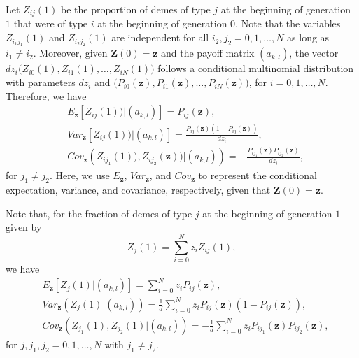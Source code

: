 \documentclass[11pt]{article}
\begin{document}
Let $Z_{ij}(1)$ be the proportion of demes of type $j$ at the beginning of generation $1$ that were of type $i$ at the beginning of generation $0$. Note that  the variables $Z_{i_1j_1}(1)$ and $Z_{i_2j_2}(1)$ are independent for all $i_2,j_2=0,1,\ldots,N$ as long as $i_1\neq i_2$. Moreover, given $\mathbf{Z}(0)=\mathbf{z}$ and the payoff matrix $(a_{k, l})$, the vector $dz_i\Big(Z_{i0}(1),Z_{i1}(1),\ldots,Z_{iN}(1)\Big)$ follows a conditional multinomial distribution with parameters $dz_i$ and $\Big(P_{i0}(\mathbf{z}),P_{i1}(\mathbf{z}),\ldots,P_{iN}(\mathbf{z})\Big)$, for $i=0, 1, \ldots, N$.
Therefore, we have
\begin{subequations}\label{sec2-eq1}
\begin{align}
&E_{\mathbf{z}}\left[ Z_{ij}(1))\Big|(a_{k,l})\right]=P_{ij}(\mathbf{z}),\\
&Var_{\mathbf{z}}\left[ Z_{ij}(1))\Big|(a_{k,l})\right]=\frac{P_{ij}(\mathbf{z})\left(1-P_{ij}(\mathbf{z})\right)}{dz_i},\\
&Cov_{\mathbf{z}}\left(Z_{ij_1}(1)),Z_{ij_2}(\mathbf{z}))\Big|(a_{k,l})\right)=-\frac{P_{ij_1}(\mathbf{z})P_{ij_2}(\mathbf{z})}{dz_i},
\end{align}
\end{subequations}
for $j_1\not= j_2$. Here, we use $E_{\mathbf{z}}$, $Var_{\mathbf{z}}$, and $Cov_{\mathbf{z}}$ to represent the conditional expectation, variance, and covariance, respectively, given that $\mathbf{Z}(0)=\mathbf{z}$.

Note that, for the fraction of demes of type $j$ at the beginning of generation $1$ given by
\begin{equation}\label{sec2-eq2}
Z_j(1)=\sum_{i=0}^{N}z_iZ_{ij}(1),
\end{equation}
we have
\begin{subequations}\label{sec2-eq3}
\begin{align}
&E_{\mathbf{z}}\left[Z_j(1)\Big|(a_{k,l})\right]=\sum_{i=0}^{N}z_iP_{ij}(\mathbf{z}),\\
&Var_{\mathbf{z}}\left(Z_j(1)\Big|(a_{k,l})\right)
=\frac{1}{d}\sum_{i=0}^{N}z_iP_{ij}(\mathbf{z})\left(1-P_{ij}(\mathbf{z})\right),\\
&Cov_{\mathbf{z}}\left(Z_{j_1}(1),Z_{j_2}(1)\Big|(a_{k,l})\right)
=-\frac{1}{d}\sum_{i=0}^{N}z_iP_{ij_1}(\mathbf{z})P_{ij_2}(\mathbf{z}),
\end{align}
\end{subequations}
for $j, j_1, j_2=0, 1, \ldots, N$ with $j_1\ne j_2$. 
\end{document}
